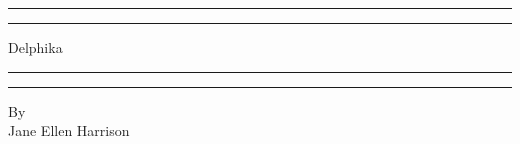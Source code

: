 \documentclass[a4paper, 11pt, oneside, polutonikogreek, english]{article}
\begin{document}
\renewcommand{\thefigure}{\Fontauri{\arabic{figure}}}
\renewcommand\thefootnote{\Fontauri{\arabic{footnote}}}
\let\oldfootnote\footnote
    \renewcommand{\footnote}[1]{\oldfootnote{\Fontauri\large#1}}
\begin{titlepage} %
	\centering %
	\scshape %

	
	\rule{\textwidth}{1.6pt}\vspace*{-\baselineskip}\vspace*{2pt} %
	\rule{\textwidth}{0.4pt} %
	
	\vspace{0.75\baselineskip} %

        {\Huge Delphika \\} %
	
	\vspace{0.75\baselineskip} %
	
	\rule{\textwidth}{0.4pt}\vspace*{-\baselineskip}\vspace{3.2pt} %
	\rule{\textwidth}{1.6pt} %
	
	\vspace{1\baselineskip} %
	
	
	{\large By \\\LARGE Jane Ellen Harrison\\} %
	
	\vspace*{1\baselineskip} %
	
	
	
	
		

\end{titlepage}
\end{document}

